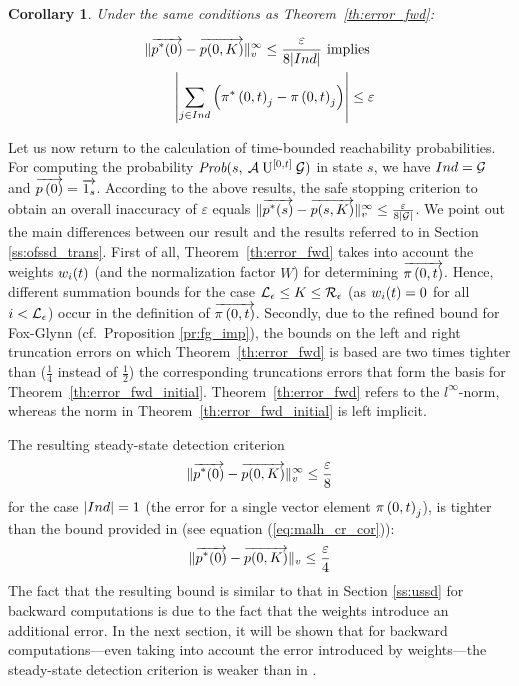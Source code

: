 \documentclass[times, 10pt,twocolumn]{article}
\newtheorem{corollary}[theorem]{Corollary}
\begin{document}
		\begin{corollary}
			Under the same conditions as Theorem~\ref{th:error_fwd}:
			{\small
				\begin{fframe}{0.8}{-0.3}
					\begin{eqnarray}
						\lVert  \overrightarrow{p^{*}(0)} - \overrightarrow{p(0,K)}  \rVert_{v}^{\infty} \leq \frac{\varepsilon}{8 |Ind|} \text{ implies } \nonumber \\
						\left| \sum_{j \in Ind} \left( \pi^{*} \left(0, t \right )_{j} - \pi \left(0, t \right )_{j} \right) \right| \leq \varepsilon \label{eq:our_fwd_cor}
					\end{eqnarray}
				\end{fframe}
			}
			\label{cl:error_fwd}
		\end{corollary}
		
		Let us now return to the calculation of time-bounded reachability probabilities. For computing the probability $\mbox{\it Prob}(s, \: \mathcal{A} \: \mathrm{U}^{[0,t]} \: \mathcal{G} )$ in state $s$, we have $Ind = \mathcal{G}$ and $\overrightarrow{p \left( 0 \right)} = \overrightarrow{1_{s} }$.  According to the above results, the safe stopping criterion to obtain an overall inaccuracy of $\varepsilon$ equals  $\lVert  \overrightarrow{p^{*}(s)} - \overrightarrow{p(s,K)}  \rVert_{v}^{\infty} \leq \frac{\varepsilon}{8 | \mathcal{G} |}$. We point out the main differences between our result and the results referred to in Section \ref{ss:ofssd_trans}.
		First of all, Theorem~\ref{th:error_fwd} takes into account the weights $w_{i}(t)$ (and the normalization factor $W$) for determining $\overrightarrow{\pi \left(0, t \right )}$.  Hence, different summation bounds for the case $\mathcal{L}_{\epsilon} \leq K \leq \mathcal{R}_{\epsilon}$ (as $w_{i}(t) = 0$ for all $i < \mathcal{L}_{\epsilon}$) occur in the definition of $\overrightarrow{\pi \left(0, t \right )}$.  Secondly, due to the refined bound for Fox-Glynn (cf.\ Proposition \ref{pr:fg_imp}), the bounds on the left and right truncation errors on which Theorem~\ref{th:error_fwd} is based are two times tighter than ($\frac{1}{4}$ instead of $\frac{1}{2}$) the corresponding truncations errors that form the basis for Theorem~\ref{th:error_fwd_initial}.  Theorem~\ref{th:error_fwd} refers to the $l^{\infty}$-norm, whereas the norm in Theorem~\ref{th:error_fwd_initial} is left implicit.

		The resulting steady-state detection criterion
			\[
				\lVert  \overrightarrow{p^{*}(0)} - \overrightarrow{p(0,K)}  \rVert_{v}^{\infty} \leq \frac{\varepsilon}{8}
			\]
		for the case $|Ind| = 1$ (the error for a single vector element $\pi \left(0, t \right )_{j}$), is tighter than the bound provided in \cite{MalhotraMT_MR94} (see equation (\ref{eq:malh_cr_cor})):
			\[
				\lVert \overrightarrow{p^{*}(0)} - \overrightarrow{p(0,K)} \rVert_{v} \leq \frac{\varepsilon}{4}
			\]
		The fact that the resulting bound is similar to that in Section \ref{ss:ussd} for backward computations is due to the fact that the weights introduce an additional error. In the next section, it will be shown that for backward computations---even taking into account the error introduced by weights---the steady-state detection criterion is weaker than in \cite{YounesKNP_STTT05} . 
\end{document}
